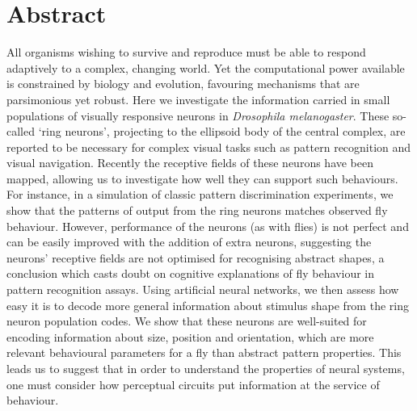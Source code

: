 \section*{Abstract}
All organisms wishing to survive and reproduce must be able to respond adaptively to a complex, changing world. Yet the computational power available is constrained by biology and evolution, favouring mechanisms that are parsimonious yet robust. Here we investigate the information carried in small populations of visually responsive neurons in \emph{Drosophila melanogaster}. These so-called `ring neurons', projecting to the ellipsoid body of the central complex, are reported to be necessary for complex visual tasks such as pattern recognition and visual navigation. Recently the receptive fields of these neurons have been mapped, allowing us to investigate how well they can support such behaviours. For instance, in a simulation of classic pattern discrimination experiments, we show that the patterns of output from the ring neurons matches observed fly behaviour. However, performance of the neurons (as with flies) is not perfect and can be easily improved with the addition of extra neurons, suggesting the neurons' receptive fields are not optimised for recognising abstract shapes, a conclusion which casts doubt on cognitive explanations of fly behaviour in pattern recognition assays. Using artificial neural networks, we then assess how easy it is to decode more general information about stimulus shape from the ring neuron population codes. We show that these neurons are well-suited for encoding information about size, position and orientation, which are more relevant behavioural parameters for a fly than abstract pattern properties. This leads us to suggest that in order to understand the properties of neural systems, one must consider how perceptual circuits put information at the service of behaviour.


